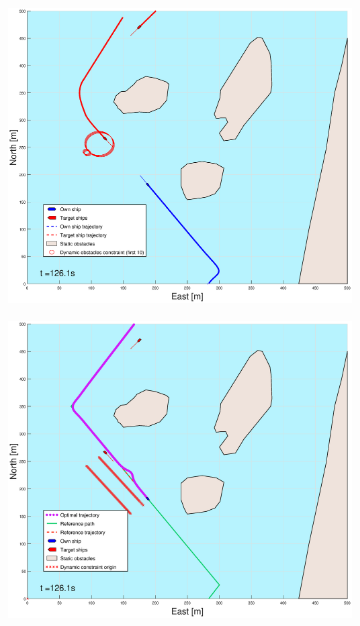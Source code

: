 \begin{figure}[ht]
\begin{subfigure}[b]{0.499\textwidth}
    \end{subfigure}
    \hfill
    \\
    \begin{subfigure}[b]{0.49\textwidth}
        \centering
        \includegraphics[width=\textwidth]{Images/Figures/Helloya/_Simple_1fig1_time=126}
    \end{subfigure}
    \hfill
    \begin{subfigure}[b]{0.499\textwidth}
        \centering
        \includegraphics[width=\textwidth]{Images/Figures/Helloya/_Simple_1fig999_time=126}

\end{subfigure}
\end{figure}
